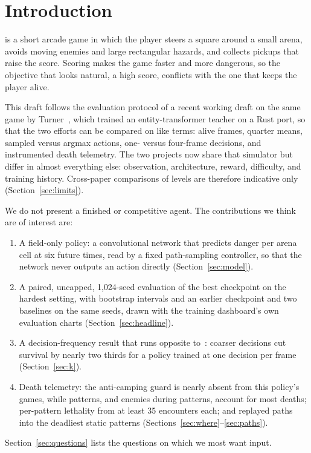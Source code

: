 \documentclass[journal]{IEEEtran}
\begin{document}
\section{Introduction}
 is a short arcade game in which the player steers a
square around a small arena, avoids moving enemies and large rectangular
hazards, and collects pickups that raise the score. Scoring makes the game
faster and more dangerous, so the objective that looks natural, a high score,
conflicts with the one that keeps the player alive.

This draft follows the evaluation protocol of a recent working draft on the
same game by Turner~\cite{turner}, which trained an entity-transformer teacher
on a Rust port, so that the two efforts can be compared on like terms: alive
frames, quarter means, sampled versus argmax actions, one- versus four-frame
decisions, and instrumented death telemetry. The two projects now share that
simulator but differ in almost everything else: observation, architecture,
reward, difficulty, and training history. Cross-paper comparisons of levels are
therefore indicative only (Section~\ref{sec:limits}).

We do not present a finished or competitive agent. The contributions we think
are of interest are:
\begin{enumerate}
\item A field-only policy: a convolutional network that predicts danger per
  arena cell at six future times, read by a fixed path-sampling controller, so
  that the network never outputs an action directly (Section~\ref{sec:model}).
\item A paired, uncapped, 1,024-seed evaluation of the best checkpoint on
  the hardest setting, with bootstrap intervals and an earlier checkpoint and
  two baselines on the same seeds, drawn with the training dashboard's own
  evaluation charts (Section~\ref{sec:headline}).
\item A decision-frequency result that runs opposite to~\cite{turner}:
  coarser decisions cut survival by nearly two thirds for a policy trained at
  one decision per frame (Section~\ref{sec:k}).
\item Death telemetry: the anti-camping guard is nearly absent from this
  policy's games, while patterns, and enemies during patterns, account for
  most deaths; per-pattern lethality from at least 35 encounters each; and
  replayed paths into the deadliest static patterns
  (Sections~\ref{sec:where}--\ref{sec:paths}).
\end{enumerate}
Section~\ref{sec:questions} lists the questions on which we most want input.
\end{document}
